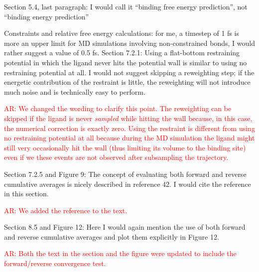 \documentclass[10pt,stdletter]{newlfm}
\begin{document}
\begin{newlfm}
Section 5.4, last paragraph: I would call it “binding free energy prediction”, not “binding energy prediction”

Constraints and relative free energy calculations: for me, a timestep of 1 fs is more an upper limit for MD simulations involving non-constrained bonds, I would rather suggest a value of 0.5 fs.
\textcolor{MRS: This is a valuable point to raise. Certainly 1.0 fs is near the limit of stability without any constraints with standard fields, and there are studies showing there are nonnegligible statistical mechanical errors with timesteps of 1.0 fs. However, many studies with free energy calculations have been done with these parameters and it's not clear they have statistically significant deviation from simulations without simulations. We have added a discussion of timestep to section XXXX with a tentative recommendation that 1.0 fs may be sufficient, but some warnings there may be potentially be issues}

Section 7.2.1: Using a flat-bottom restraining potential in which the ligand never hits the potential wall is similar to using no restraining potential at all. I would not suggest skipping a reweighting step; if the energetic contribution of the restraint is little, the reweighting will not introduce much noise and is technically easy to perform.

\textcolor{red}{AR: We changed the wording to clarify this point. The reweighting can be skipped if the ligand is never \textit{sampled} while hitting the wall because, in this case, the numerical correction is exactly zero. Using the restraint is different from using no restraining potential at all because during the MD simulation the ligand might still very occasionally hit the wall (thus limiting its volume to the binding site) even if we these events are not observed after subsampling the trajectory.}

Section 7.2.5 and Figure 9: The concept of evaluating both forward and reverse cumulative averages is nicely described in reference 42. I would cite the reference in this section.

\textcolor{red}{AR: We added the reference to the text.}

Section 8.5 and Figure 12: Here I would again mention the use of both forward and reverse cumulative averages and plot them explicitly in Figure 12.

\textcolor{red}{AR: Both the text in the section and the figure were updated to include the forward/reverse convergence test.}


\end{newlfm}
\end{document}
